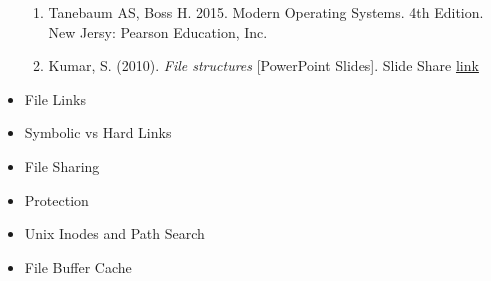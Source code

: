 \documentclass[12pt]{article}
\begin{document}
\begin{itemize}
    \begin{enumerate}[1)]
        \item Tanebaum AS, Boss H. 2015. Modern Operating Systems. 4th Edition. New Jersy: Pearson Education, Inc.
        \item Kumar, S. (2010). \textit{File structures} [PowerPoint Slides]. Slide Share \href{https://www.slideshare.net/shyamujaco/file-structures}{link}
    \end{enumerate}
    \item File Links
    \item Symbolic vs Hard Links
    \item File Sharing
    \item Protection
    \item Unix Inodes and Path Search
    \item File Buffer Cache
\end{itemize}
\end{document}
